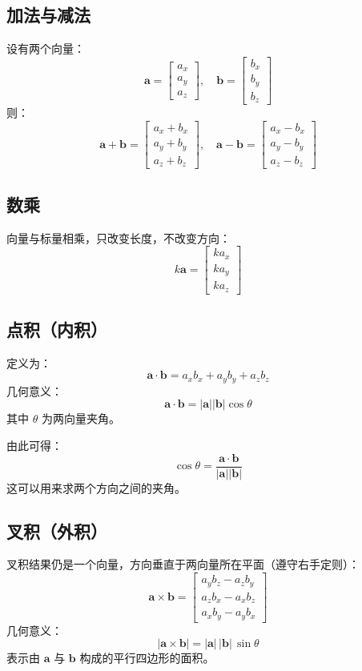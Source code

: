 \documentclass[12pt,a4paper]{article}
\begin{document}
\subsection{加法与减法}
设有两个向量：
\[
\boldsymbol{a} =
\begin{bmatrix}
a_x \\ a_y \\ a_z
\end{bmatrix},
\quad
\boldsymbol{b} =
\begin{bmatrix}
b_x \\ b_y \\ b_z
\end{bmatrix}
\]
则：
\[
\boldsymbol{a} + \boldsymbol{b} =
\begin{bmatrix}
a_x + b_x \\ a_y + b_y \\ a_z + b_z
\end{bmatrix},
\quad
\boldsymbol{a} - \boldsymbol{b} =
\begin{bmatrix}
a_x - b_x \\ a_y - b_y \\ a_z - b_z
\end{bmatrix}
\]

\subsection{数乘}
向量与标量相乘，只改变长度，不改变方向：
\[
k\boldsymbol{a} =
\begin{bmatrix}
k a_x \\ k a_y \\ k a_z
\end{bmatrix}
\]

\subsection{点积（内积）}
定义为：
\[
\boldsymbol{a}\cdot\boldsymbol{b} = a_x b_x + a_y b_y + a_z b_z
\]
几何意义：
\[
\boldsymbol{a}\cdot\boldsymbol{b} = |\boldsymbol{a}||\boldsymbol{b}|\cos\theta
\]
其中 $\theta$ 为两向量夹角。

由此可得：
\[
\boxed{\cos\theta = \dfrac{\boldsymbol{a}\cdot\boldsymbol{b}}{|\boldsymbol{a}||\boldsymbol{b}|}}
\]
这可以用来求两个方向之间的夹角。

\subsection{叉积（外积）}
叉积结果仍是一个向量，方向垂直于两向量所在平面（遵守右手定则）：
\[
\boldsymbol{a}\times\boldsymbol{b} =
\begin{bmatrix}
a_y b_z - a_z b_y \\
a_z b_x - a_x b_z \\
a_x b_y - a_y b_x
\end{bmatrix}
\]
几何意义：
\[
|\boldsymbol{a}\times\boldsymbol{b}| = |\boldsymbol{a}|\,|\boldsymbol{b}|\,\sin\theta
\]
表示由 $\boldsymbol{a}$ 与 $\boldsymbol{b}$ 构成的平行四边形的面积。
\end{document}
